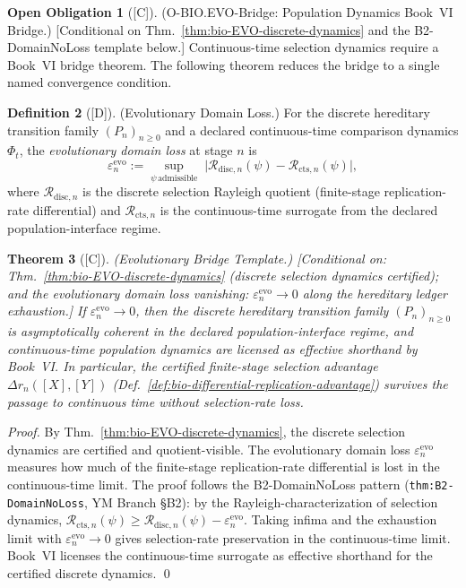 \documentclass[12pt,oneside]{amsbook}
\theoremstyle{plain}
\newtheorem{theorem}{Theorem}[section]
\theoremstyle{definition}
\newtheorem{definition}[theorem]{Definition}
\newtheorem{obligation}[theorem]{Open Obligation}
\theoremstyle{remark}
\newcommand{\status}[1]{\textup{[#1]}}
\begin{document}
\begin{obligation}[\status{C}]\label{ob:bio-EVO-pop-bridge}
\textup{(O-BIO.EVO-Bridge: Population Dynamics Book~VI Bridge.)}
\textup{[Conditional on Thm.~\ref{thm:bio-EVO-discrete-dynamics}
and the B2-DomainNoLoss template below.]}
Continuous-time selection dynamics require a Book~VI bridge theorem.
The following theorem reduces the bridge to a single named
convergence condition.
\end{obligation}

\begin{definition}[\status{D}]\label{def:bio-EVO-domain-loss}
\textup{(Evolutionary Domain Loss.)}
For the discrete hereditary transition family $(P_n)_{n\ge0}$
and a declared continuous-time comparison dynamics $\Phi_t$,
the \emph{evolutionary domain loss} at stage $n$ is
\[
 \varepsilon_n^{\mathrm{evo}} :=
 \sup_{\psi\,\mathrm{admissible}}\;
 \bigl|
 \mathcal{R}_{\mathrm{disc},n}(\psi)
 - \mathcal{R}_{\mathrm{cts},n}(\psi)
 \bigr|,
\]
where $\mathcal{R}_{\mathrm{disc},n}$ is the discrete selection
Rayleigh quotient (finite-stage replication-rate differential)
and $\mathcal{R}_{\mathrm{cts},n}$ is the continuous-time surrogate
from the declared population-interface regime.
\end{definition}

\begin{theorem}[\status{C}]\label{thm:bio-EVO-bridge-template}
\textup{(Evolutionary Bridge Template.)}
\textup{[Conditional on: Thm.~\ref{thm:bio-EVO-discrete-dynamics}
(discrete selection dynamics certified); and the evolutionary
domain loss vanishing: $\varepsilon_n^{\mathrm{evo}} \to 0$
along the hereditary ledger exhaustion.]}
If $\varepsilon_n^{\mathrm{evo}} \to 0$, then the discrete hereditary
transition family $(P_n)_{n\ge0}$ is asymptotically coherent in the
declared population-interface regime, and continuous-time population
dynamics are licensed as effective shorthand by Book~VI.
In particular, the certified finite-stage selection advantage
$\Delta r_n([X],[Y])$ (Def.~\ref{def:bio-differential-replication-advantage})
survives the passage to continuous time without selection-rate loss.
\end{theorem}

\begin{proof}
By Thm.~\ref{thm:bio-EVO-discrete-dynamics}, the discrete selection
dynamics are certified and quotient-visible. The evolutionary domain
loss $\varepsilon_n^{\mathrm{evo}}$ measures how much of the
finite-stage replication-rate differential is lost in the
continuous-time limit. The proof follows the B2-DomainNoLoss
pattern (\texttt{thm:B2-DomainNoLoss}, YM Branch §B2): by the
Rayleigh-characterization of selection dynamics,
$\mathcal{R}_{\mathrm{cts},n}(\psi) \ge
\mathcal{R}_{\mathrm{disc},n}(\psi) - \varepsilon_n^{\mathrm{evo}}$.
Taking infima and the exhaustion limit with
$\varepsilon_n^{\mathrm{evo}} \to 0$ gives selection-rate preservation
in the continuous-time limit. Book~VI licenses the continuous-time
surrogate as effective shorthand for the certified discrete dynamics.
\qed
\end{proof}
\end{document}
